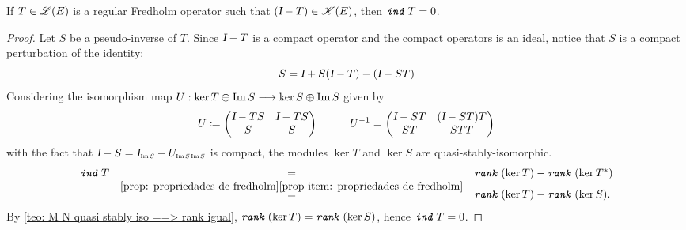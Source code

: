 \begin{proposicao}
\label{prop: ind(I - K) = 0}
If $T\in \mathscr L(E)$ is a regular Fredholm operator such that $(\textsl{I} - T)\in \mathscr K(E)$, then $\texttt{\textit{ind}}\, T = 0$.
\begin{proof}
    Let $S$ be a pseudo-inverse of $T$. Since $\textsl{I} - T$ is a compact operator and the compact operators is an ideal, notice that $S$ is a compact perturbation of the identity:
    \begin{equation*}
        S = \textsl{I} + S(\textsl{I} - T) - (\textsl{I} - ST)
    \end{equation*}
    Considering the isomorphism map $U : \ker T\oplus \operatorname{Im} S \longrightarrow \ker S \oplus \operatorname{Im} S$ given by
    \begin{equation*}
        U \coloneqq \begin{pmatrix} \textsl{I} - TS  & \textsl{I} - TS \\ S  & S \end{pmatrix} \hspace{1cm} {U}^{-1} = \begin{pmatrix} \textsl{I} - ST & (\textsl{I} - ST)T \\ ST & STT \end{pmatrix}
    \end{equation*}
    with the fact that $\Id - S = \sub\Id{\Im S} - \sub{U}{\Im S\Im S}$ is compact, the modules $\ker T$ and $\ker S$ are quasi-stably-isomorphic. 
    \begin{equation*}
        \begin{array}{rcl}
            \texttt{\textit{ind}}\, T &=& \texttt{\textit{rank}}\,(\ker T) - \texttt{\textit{rank}}\,(\ker T^*) \\
            &\overset{\ref{prop: propriedades de fredholm}\ref{prop item: propriedades de fredholm}}=& \texttt{\textit{rank}}\,(\ker T) - \texttt{\textit{rank}}\,(\ker S).
        \end{array}
    \end{equation*}
    By \ref{teo: M N quasi stably iso ==> rank igual}, $\texttt{\textit{rank}}\,(\ker T) = \texttt{\textit{rank}}\,(\ker S)$, hence $\texttt{\textit{ind}}\, T = 0$.
\end{proof}
\end{proposicao}

